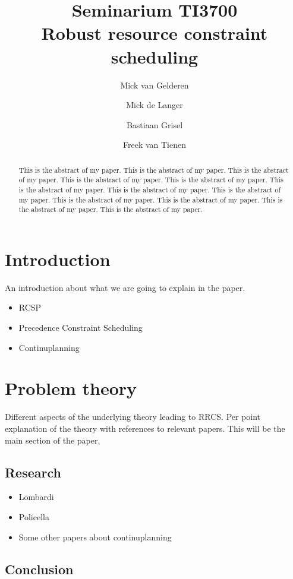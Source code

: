 \documentclass{article}
\title{Seminarium TI3700\\Robust resource constraint scheduling}
\author{Mick van Gelderen  \and
    Mick de Langer \and
    Bastiaan Grisel \and
    Freek van Tienen}
\date{}
\begin{document}
\maketitle
\thispagestyle{empty}

\begin{abstract}
This is the abstract of my paper.
This is the abstract of my paper.
This is the abstract of my paper.
This is the abstract of my paper.
This is the abstract of my paper.
This is the abstract of my paper.
This is the abstract of my paper.
This is the abstract of my paper.
This is the abstract of my paper.
This is the abstract of my paper.
This is the abstract of my paper.
This is the abstract of my paper.
\end{abstract}


\section{Introduction}

An introduction about what we are going to explain in the paper.

\begin{itemize}
\item RCSP
\item Precedence Constraint Scheduling
\item Continuplanning
\end{itemize}


\section{Problem theory}

Different aspects of the underlying theory leading to RRCS.  Per point explanation of the theory with references to relevant papers. This will be the main section of the paper.

\subsection{Research}

\begin{itemize}
\item Lombardi
\item Policella
\item Some other papers about continuplanning
\end{itemize}

\subsection{Conclusion}
\end{document}
